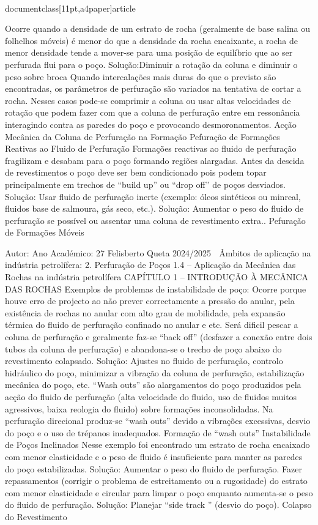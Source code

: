 \\documentclass[11pt,a4paper]{article}
\begin{document}
Ocorre quando a densidade de um 
estrato de rocha (geralmente de base 
salina ou folhelhos móveis) é menor do 
que a densidade da rocha encaixante, a 
rocha de menor densidade tende a 
mover-se para uma posição de equilíbrio 
que ao ser perfurada flui para o poço.
Solução:Diminuir a rotação da coluna e 
diminuir o peso sobre broca
Quando intercalações mais duras do que o 
previsto são encontradas, os parâmetros 
de perfuração são variados na tentativa de 
cortar a rocha. Nesses casos pode-se 
comprimir a coluna ou usar altas 
velocidades de rotação que podem fazer 
com que a coluna de perfuração entre em 
ressonância interagindo contra as paredes 
do poço e provocando desmoronamentos.
Acção Mecânica
da Coluna de
Perfuração na
Formação
Pefuração de 
Formações 
Reativas ao 
Fluido de 
Perfuração
Formações reactivas ao fluido de perfuração 
fragilizam e desabam para o poço formando 
regiões alargadas. Antes da descida de 
revestimentos o poço deve ser bem 
condicionado pois podem topar 
principalmente em trechos de “build up” ou 
“drop off” de poços desviados.
Solução: Usar fluido de perfuração inerte 
(exemplo: óleos sintéticos ou minreal, 
fluidos base de salmoura, gás seco, etc.).
Solução: Aumentar o peso do fluido 
de perfuração se possível ou 
assentar uma coluna de 
revestimento extra..
Pefuração de 
Formações 
Móveis\

Autor:
Ano Académico:
27
Felisberto Queta
2024/2025

 Âmbitos de aplicação na indústria petrolífera:
2. Perfuração de Poços
1.4 – Aplicação da Mecânica das Rochas na indústria petrolífera
CAPÍTULO 1 
–
 INTRODUÇÃO À MECÂNICA DAS ROCHAS
Exemplos de problemas de instabilidade de poço:
Ocorre porque houve erro de projecto ao 
não prever correctamente a pressão do 
anular, pela existência de rochas no anular 
com alto grau de mobilidade, pela expansão 
térmica do fluido de perfuração confinado no 
anular e etc.
Será dificil pescar a coluna de perfuração e 
geralmente faz-se “back off” (desfazer a 
conexão entre dois tubos da coluna de 
perfuração) e abandona-se o trecho de poço 
abaixo do revestimento colapsado.
Solução: Ajustes no fluido de perfuração, 
controlo hidráulico do poço, minimizar a 
vibração da coluna de perfuração, 
estabilização mecânica do poço, etc.
“Wash outs” são alargamentos do poço 
produzidos pela acção do fluido de perfuração 
(alta velocidade do fluido, uso de fluidos 
muitos agressivos, baixa reologia do fluido) 
sobre formações inconsolidadas. Na perfuração 
direcional produz-se “wash outs” devido a 
vibrações excessivas, desvio do poço e o uso de 
trépanos inadequados.
Formação de 
“wash outs”
Instabilidade de 
Poços Inclinados
Nesse exemplo foi encontrado um estrato de 
rocha encaixado com menor elasticidade e o 
peso de fluido é insuficiente para manter as 
paredes do poço estabilizadas.
Solução: Aumentar o peso do fluido de 
perfuração. Fazer repassamentos (corrigir o 
problema de estreitamento ou a rugosidade) do 
estrato com menor elasticidade e circular para 
limpar o poço enquanto aumenta-se o peso do 
fluido de perfuração.
Solução: Planejar “side track ” (desvio 
do poço).
Colapso do 
Revestimento\
\end{document}
